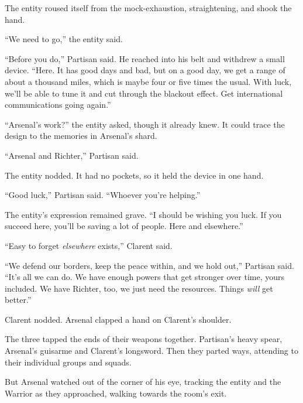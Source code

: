 The entity roused itself from the mock-exhaustion, straightening, and shook the hand.



``We need to go,'' the entity said.



``Before you do,'' Partisan said.  He reached into his belt and withdrew a small device.  ``Here.  It has good days and bad, but on a good day, we get a range of about a thousand miles, which is maybe four or five times the usual.  With luck, we'll be able to tune it and cut through the blackout effect.  Get international communications going again.''



``Arsenal's work?'' the entity asked, though it already knew.  It could trace the design to the memories in Arsenal's shard.



``Arsenal and Richter,'' Partisan said.



The entity nodded.  It had no pockets, so it held the device in one hand.



``Good luck,'' Partisan said.  ``Whoever you're helping.''



The entity's expression remained grave.  ``I should be wishing you luck.  If you succeed here, you'll be saving a lot of people.  Here and elsewhere.''



``Easy to forget \emph{elsewhere} exists,'' Clarent said.



``We defend our borders, keep the peace within, and we hold out,'' Partisan said.  ``It's all we can do.  We have enough powers that get stronger over time, yours included.  We have Richter, too, we just need the resources.  Things \emph{will} get better.''



Clarent nodded.  Arsenal clapped a hand on Clarent's shoulder.



The three tapped the ends of their weapons together.  Partisan's heavy spear, Arsenal's guisarme and Clarent's longsword.  Then they parted ways, attending to their individual groups and squads.



But Arsenal watched out of the corner of his eye, tracking the entity and the Warrior as they approached, walking towards the room's exit.



